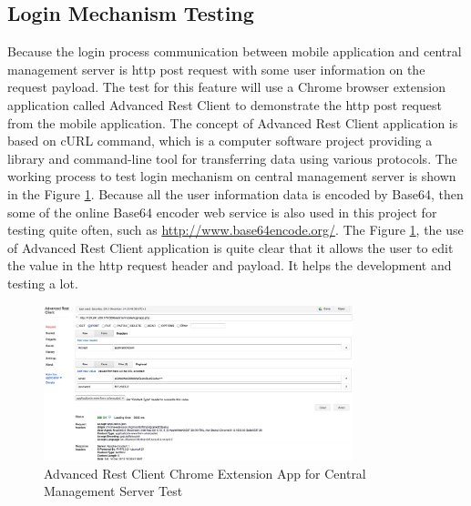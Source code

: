 \subsection{Login Mechanism Testing}
\par Because the login process communication between mobile application and central management server is \gls{http} post request with some user information on the request payload. The test for this feature will use a Chrome browser extension application called Advanced Rest Client to demonstrate the \gls{http} post request from the mobile application. The concept of Advanced Rest Client application is based on cURL\cite{curl} command, which is a computer software project providing a library and command-line tool for transferring data using various protocols. The working process to test login mechanism on central management server is shown in the Figure \ref{fig:restclient_test}. Because all the user information data is encoded by Base64, then some of the online Base64 encoder web service is also used in this project for testing quite often, such as \url{http://www.base64encode.org/}. The Figure \ref{fig:restclient_test}, the use of Advanced Rest Client application is quite clear that it allows the user to edit the value in the \gls{http} request header and payload. It helps the development and testing a lot.
\begin{figure}
	\centering
    	\includegraphics[width=0.80\textwidth,natwidth=610,natheight=642]{figs/restclient_test.png}
  	\caption{Advanced Rest Client Chrome Extension App for Central Management Server Test}
  	\label{fig:restclient_test}
\end{figure}

